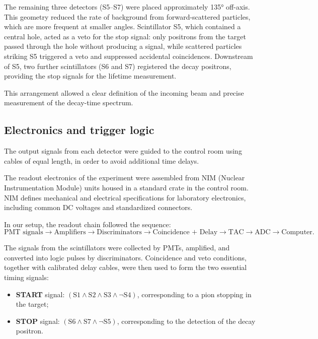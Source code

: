 \documentclass[11pt,a4paper]{article}
\begin{document}
The remaining three detectors (S5–S7) were placed approximately 135° off-axis. This geometry reduced the rate of background from forward-scattered particles, which are more frequent at smaller angles. Scintillator S5, which contained a central hole, acted as a veto for the stop signal: only positrons from the target passed through the hole without producing a signal, while scattered particles striking S5 triggered a veto and suppressed accidental coincidences. Downstream of S5, two further scintillators (S6 and S7) registered the decay positrons, providing the stop signals for the lifetime measurement.

This arrangement allowed a clear definition of the incoming beam and precise measurement of the decay-time spectrum.



\subsection{Electronics and trigger logic}
\label{Electronics and triger logic}
The output signals from each detector were guided to the control room using cables of equal length, in order to avoid additional time delays. 

The readout electronics of the experiment were assembled from NIM (Nuclear Instrumentation Module) units housed in a standard crate in the control room.
NIM defines mechanical and electrical specifications for laboratory electronics, including common DC voltages and standardized connectors.

In our setup, the readout chain followed the sequence:
\[
\text{PMT signals} \rightarrow \text{Amplifiers} \rightarrow \text{Discriminators} \rightarrow
\text{Coincidence + Delay} \rightarrow \text{TAC} \rightarrow \text{ADC} \rightarrow \text{Computer}.
\]

The signals from the scintillators were collected by PMTs, amplified, and converted into logic pulses by discriminators.
Coincidence and veto conditions, together with calibrated delay cables, were then used to form the two essential timing signals:

\begin{itemize}
    \item \textbf{START} signal: $(\text{S1} \land \text{S2} \land \text{S3} \land \lnot \text{S4})$, corresponding to a pion stopping in the target;
    \item \textbf{STOP} signal: $(\text{S6} \land \text{S7} \land \lnot \text{S5})$, corresponding to the detection of the decay positron.
\end{itemize}
\end{document}
